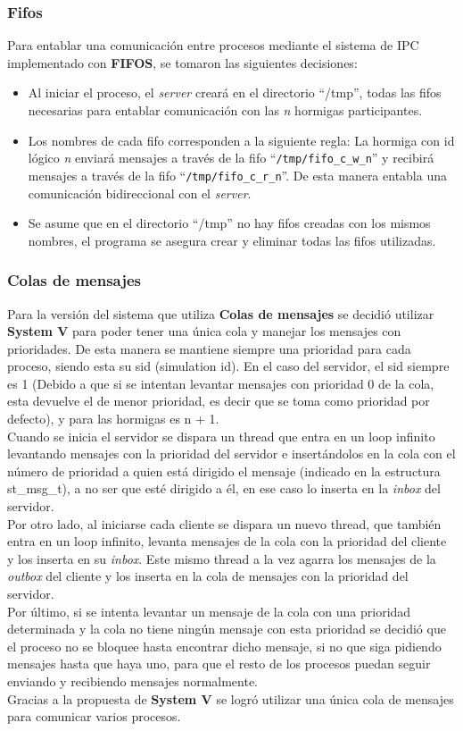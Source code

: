 \documentclass[a4paper,10pt]{article}
\begin{document}
\subsubsection{Fifos}
Para entablar una comunicación entre procesos mediante el sistema de IPC implementado con \textbf{FIFOS}, se tomaron las siguientes decisiones:
\begin{itemize}
 \item Al iniciar el proceso, el \textit{server} creará en el directorio ``/tmp'', todas las fifos necesarias para entablar comunicación 
con las \textit{n} hormigas participantes.
 \item Los nombres de cada fifo corresponden a la siguiente regla: La hormiga con id lógico \textit{n} enviará mensajes a través de la fifo 
``\verb|/tmp/fifo_c_w_n|'' y recibirá mensajes a través de la fifo ``\verb|/tmp/fifo_c_r_n|''. De esta manera entabla una comunicación
bidireccional con el \textit{server}.
  \item Se asume que en el directorio ``/tmp'' no hay fifos creadas con los mismos nombres, el programa se asegura crear y eliminar todas las 
fifos utilizadas.
\end{itemize}


\subsubsection{Colas de mensajes}
Para la versión del sistema que utiliza \textbf{Colas de mensajes} se decidió utilizar \textbf{System V} para poder tener una única cola y 
manejar los mensajes con prioridades. De esta manera se mantiene siempre una prioridad para cada proceso, siendo esta su sid (simulation id).
En el caso del servidor, el sid siempre es 1 (Debido a que si se intentan levantar mensajes con prioridad 0 de la cola, esta devuelve el de menor 
prioridad, es decir que se toma como prioridad por defecto), y para las hormigas es n + 1.\\
Cuando se inicia el servidor se dispara un thread que entra en un loop infinito levantando mensajes con la prioridad del servidor e 
insertándolos en la cola con el número de prioridad a quien está dirigido el mensaje (indicado en la estructura st\_msg\_t), a no ser que esté 
dirigido a él, en ese caso lo inserta en la \textit{inbox} del servidor.\\
Por otro lado, al iniciarse cada cliente se dispara un nuevo thread, que también entra en un loop infinito, levanta mensajes de la cola 
con la prioridad del cliente y los inserta en su \textit{inbox}. Este mismo thread a la vez agarra los mensajes de la \textit{outbox} del 
cliente y los inserta en la cola de mensajes con la prioridad del servidor.\\
Por último, si se intenta levantar un mensaje de la cola con una prioridad determinada y la cola no tiene ningún mensaje con esta prioridad se 
decidió que el proceso no se bloquee hasta encontrar dicho mensaje, si no que siga pidiendo mensajes hasta que haya uno, para que el resto de los 
procesos puedan seguir enviando y recibiendo mensajes normalmente.\\
Gracias a la propuesta de \textbf{System V} se logró utilizar una única cola de mensajes para comunicar varios procesos.
\end{document}

